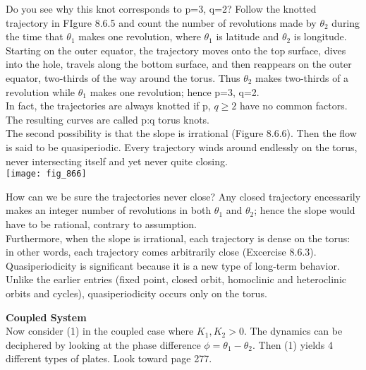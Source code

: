 \documentclass{article}
\newcommand\tab[1][1cm]{\hspace*{#1}}
\begin{document}
\tab Do you see why this knot corresponds to p=3, q=2? Follow the knotted trajectory in FIgure 8.6.5 and count the number of revolutions made by $\theta_{2}$ during the time that $\theta_{1}$ makes one revolution, where $\theta_{1}$ is latitude and $\theta_{2}$ is longitude. Starting on the outer equator, the trajectory moves onto the top surface, dives into the hole, travels along the bottom surface, and then reappears on the outer equator, two-thirds of the way around the torus. Thus $\theta_{2}$ makes two-thirds of a revolution while $\theta_{1}$ makes one revolution; hence p=3, q=2. \\ \tab
In fact, the trajectories are always knotted if p, $q \geq 2$ have no common factors. The resulting curves are called p:q torus knots. \\ \tab
The second possibility is that the slope is irrational (Figure 8.6.6). Then the flow is said to be quasiperiodic. Every trajectory winds around endlessly on the torus, never intersecting itself and yet never quite closing.  \\
\texttt{[image: fig\_866]}

How can we be sure the trajectories never close? Any closed trajectory encessarily makes an integer number of revolutions in both $\theta_{1}$ and $\theta_{2}$; hence the slope would have to be rational, contrary to assumption. \\ 
Furthermore, when the slope is irrational, each trajectory is dense on the torus: in other words, each trajectory comes arbitrarily close (Excercise 8.6.3). \\ \tab
Quasiperiodicity is significant because it is a new type of long-term behavior. Unlike the earlier entries (fixed point, closed orbit, homoclinic and heteroclinic orbits and cycles), quasiperiodicity occurs only on the torus. 

\textbf {Coupled System} \\
Now consider (1) in the coupled case where $K_{1}, K_{2}>0$. The dynamics can be deciphered by looking at the phase difference $\phi=\theta_{1}-\theta_{2}$. Then (1) yields 4 different types of plates. Look toward page 277.
\end{document}
